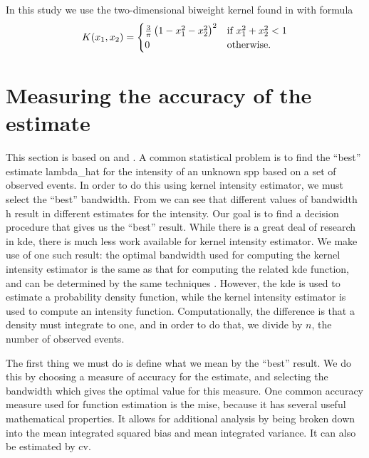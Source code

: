 In this study we use the two-dimensional biweight kernel found in \citet{silverman1986density} with formula
\begin{equation}
    \label{eq:biweightkernel2d}
    K \xvec =%
    \begin{cases}%
        \frac{3}{\pi}\left( 1 - x_1^2 - x_2^2 \right)^2 & \text{if}~x_1^2+x_2^2<1 \\%
        0 & \text{otherwise.}%
    \end{cases}%
\end{equation}

\section{Measuring the accuracy of the estimate}
\label{sec:theory:accuracy}

This section is based on \citet{silverman1986density} and \citet{wand1994kernel}.
A common statistical problem is to find the ``best'' estimate \gls{lambda_hat}
for the \gls{intensity} of an unknown \gls{spp}
based on a set of observed \glspl{event}.
In order to do this using \gls{kernel intensity estimator},
we must select the ``best'' bandwidth.
From  we can see that different values of bandwidth \gls{h} result in different estimates for the \gls{intensity}.
Our goal is to find a decision procedure that gives us the ``best'' result.
While there is a great deal of research in \gls{kde},
there is much less work available for \gls{kernel intensity estimator}.
We make use of one such result:
the optimal bandwidth used for computing the \gls{kernel intensity estimator} is the same as that for computing the related \gls{kde} function,
and can be determined by the same techniques .
However, the \gls{kde} is used to estimate a probability density function,
while the \gls{kernel intensity estimator} is used to compute an intensity function.
Computationally, the difference is that a density must integrate to one,
and in order to do that,
we divide by $n$,
the number of observed events.


The first thing we must do is define what we mean by the ``best'' result.
We do this by choosing a measure of accuracy for the estimate,
and selecting the bandwidth which gives the optimal value for this measure.
One common accuracy measure used for function estimation is the \gls{mise},
because it has several useful mathematical properties.
It allows for additional analysis by being broken down into the mean integrated squared bias and mean integrated variance.
It can also be estimated by \acrlong{cv}.

